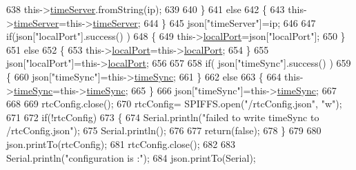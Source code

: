 \begin{DoxyCode}
638                 this->\hyperlink{classCoolTime_ad2b9858f399108cb440dd1e908916f04}{timeServer}.fromString(ip);
639                 
640             \}
641             \textcolor{keywordflow}{else}
642             \{
643                 this->\hyperlink{classCoolTime_ad2b9858f399108cb440dd1e908916f04}{timeServer}=this->\hyperlink{classCoolTime_ad2b9858f399108cb440dd1e908916f04}{timeServer};
644             \}
645             json[\textcolor{stringliteral}{"timeServer"}]=ip;
646             
647             \textcolor{keywordflow}{if}(json[\textcolor{stringliteral}{"localPort"}].success() )
648             \{                       
649                 this->\hyperlink{classCoolTime_a2f777da44d7ba678be8185299e9b49d1}{localPort}=json[\textcolor{stringliteral}{"localPort"}];
650             \}
651             \textcolor{keywordflow}{else}
652             \{
653                 this->\hyperlink{classCoolTime_a2f777da44d7ba678be8185299e9b49d1}{localPort}=this->\hyperlink{classCoolTime_a2f777da44d7ba678be8185299e9b49d1}{localPort};
654             \}
655             json[\textcolor{stringliteral}{"localPort"}]=this->\hyperlink{classCoolTime_a2f777da44d7ba678be8185299e9b49d1}{localPort};
656 
657 
658             \textcolor{keywordflow}{if}( json[\textcolor{stringliteral}{"timeSync"}].success() )
659             \{
660                 json[\textcolor{stringliteral}{"timeSync"}]=this->\hyperlink{classCoolTime_a9d032e76c3470a15b3bbbc52af6463f7}{timeSync};
661             \}
662             \textcolor{keywordflow}{else}
663             \{
664                 this->\hyperlink{classCoolTime_a9d032e76c3470a15b3bbbc52af6463f7}{timeSync}=this->\hyperlink{classCoolTime_a9d032e76c3470a15b3bbbc52af6463f7}{timeSync};
665             \}
666             json[\textcolor{stringliteral}{"timeSync"}]=this->\hyperlink{classCoolTime_a9d032e76c3470a15b3bbbc52af6463f7}{timeSync};
667 
668 
669             rtcConfig.close();
670             rtcConfig= SPIFFS.open(\textcolor{stringliteral}{"/rtcConfig.json"}, \textcolor{stringliteral}{"w"});
671             
672             \textcolor{keywordflow}{if}(!rtcConfig)
673             \{
674                 Serial.println(\textcolor{stringliteral}{"failed to write timeSync to /rtcConfig.json"});
675                 Serial.println();
676 
677                 \textcolor{keywordflow}{return}(\textcolor{keyword}{false});
678             \}
679             
680             json.printTo(rtcConfig);
681             rtcConfig.close();
682 
683             Serial.println(\textcolor{stringliteral}{"configuration is :"});
684             json.printTo(Serial);

\end{DoxyCode}
